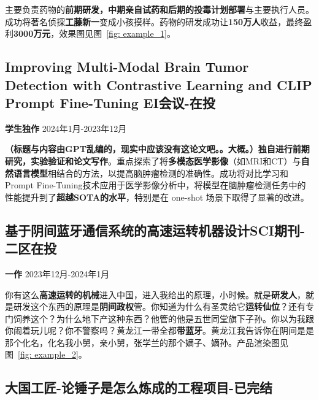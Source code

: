 \documentclass[11pt]{article}
\begin{document}
    主要负责药物的\textbf{前期研发，中期亲自试药和后期的投毒计划部署}与主要执行人员。成功将著名侦探\textbf{工藤新一}变成小孩摸样。药物的研发成功让\textbf{150万人}收益，最终盈利\textbf{3000万元}，效果图见图~\ref{fig: example_1}。
    
    \vspace{1em}                %
    \subsection{Improving Multi-Modal Brain Tumor Detection with Contrastive Learning and CLIP Prompt Fine-Tuning \hfill EI会议-在投}

    \textbf{学生独作} \hfill 2024年1月-2023年12月
    
    \textbf{（标题与内容由GPT乱编的，现实中应该没有这论文吧。。大概。）}\textbf{独自进行前期研究，实验验证和论文写作}。重点探索了将\textbf{多模态医学影像}（如MRI和CT）与\textbf{自然语言模型}相结合的方法，以提高脑肿瘤检测的准确性。成功将对比学习和Prompt Fine-Tuning技术应用于医学影像分析中，将模型在脑肿瘤检测任务中的性能提升到了\textbf{超越SOTA的水平}，特别是在 one-shot 场景下取得了显著的改进。

    \vspace{1em}                %
    \subsection{基于阴间蓝牙通信系统的高速运转机器设计\hfill SCI期刊-二区在投}
        
    \textbf{一作} \hfill 2023年12月-2024年1月
    
    你有这么\textbf{高速运转的机械}进入中国，进入我给出的原理，小时候。就是\textbf{研发人}，就是研发这个东西的原理是\textbf{阴间政权}管。你知道为什么有圣灵给它\textbf{运转仙位}？还有专门饲养这个？为什么地下产这种东西？他管的他是五世同堂旗下子孙。你以为我跟你闹着玩儿呢？你不警察吗？黄龙江一带全都\textbf{带蓝牙}。黄龙江我告诉你在阴间是是那个化名，化名我小舅，亲小舅，张学兰的那个嫡子、嫡孙。产品渲染图见图~\ref{fig: example_2}。

    \vspace{1em}
    \subsection{大国工匠-论锤子是怎么炼成的\hfill 工程项目-已完结}
        
\end{document}
